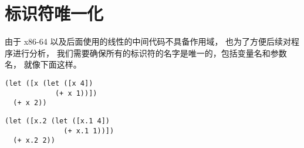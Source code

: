 \section{标识符唯一化}

由于 x86-64 以及后面使用的线性的中间代码不具备作用域，
也为了方便后续对程序进行分析，
我们需要确保所有的标识符的名字是唯一的，包括变量名和参数名，
就像下面这样。

\begin{transformation}
\begin{lstlisting}
(let ([x (let ([x 4])
            (+ x 1))])
  (+ x 2))
\end{lstlisting}
\compilesto
\begin{lstlisting}
(let ([x.2 (let ([x.1 4])
              (+ x.1 1))])
  (+ x.2 2))
\end{lstlisting}
\end{transformation}
